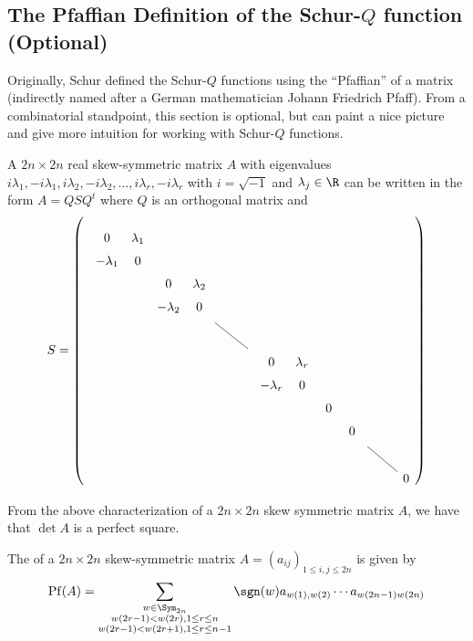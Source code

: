 \documentclass[11pt,leqno,oneside]{amsart}
\numberwithin{thm}{section}
\DeclareMathOperator{\Pf}{Pf}
\newcommand{\transpose}{t}
\begin{document}
\subsection{The Pfaffian Definition of the Schur-\(Q\) function (Optional)}
Originally, Schur defined the Schur-\(Q\) functions using the
``Pfaffian'' of a matrix (indirectly named after a German
mathematician Johann Friedrich Pfaff). From a combinatorial
standpoint, this section is optional, but can paint a nice picture and
give more intuition for working with Schur-\(Q\) functions.
\begin{prop}
  A \(2n \times 2n\) real skew-symmetric matrix \(A\) with eigenvalues
  \(i\lambda_1, -i\lambda_1, i\lambda_2, -i\lambda_2, \ldots,
  i\lambda_r, -i\lambda_r\) with \(i = \sqrt{-1}\) and \(\lambda_j \in
  \R\) can be written in the
  form \(A = QSQ^\transpose\) where \(Q\) is an orthogonal matrix
  and \[
    \def\arraystretch{1.5}
    S = \left(
      \begin{tikzcd}[ampersand replacement=\&]
        \begin{array}{cccc}
        0&\lambda_1 \\
          -\lambda_1&0 \\
          &&0&\lambda_2\\
          &&-\lambda_2&0
        \end{array} \ar[rd,dash] \\
        \&
        \begin{array}{cccc}
          0&\lambda_r\\
          -\lambda_r&0\\
           &&\ 0&\\
          &&&\ 0
        \end{array}\ar[rd,dash] \\
        \&\&0
      \end{tikzcd}
  \right)
\]
\end{prop}
\begin{cor}
  From the above characterization of a \(2n \times 2n\) skew symmetric matrix \(A\), we
  have that \(\det A\) is a perfect square.
\end{cor}
\begin{defn}
  The  of a \(2n \times 2n\) skew-symmetric matrix \(A =
  (a_{ij})_{1 \leq i,j \leq 2n}\) is given by \[
    \Pf(A) = \sum_{\substack{w \in
      \Sym_{2n} \\ w(2r-1) < w(2r), 1 \leq r \leq n \\ w(2r-1) < w(2r+1),
    1 \leq r \leq n-1}} \sgn(w) a_{w(1),w(2)} \cdots a_{w(2n-1)w(2n)}
  \]
\end{defn}
\end{document}

